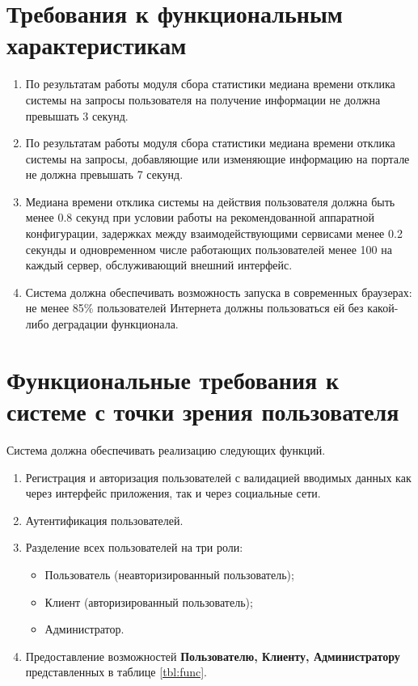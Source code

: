\section*{Требования к функциональным характеристикам}
\begin{enumerate}
	\item По результатам работы модуля сбора статистики медиана времени отклика системы на запросы пользователя на получение информации не должна превышать 3 секунд.
	
	\item По результатам работы модуля сбора статистики медиана времени отклика системы на запросы, добавляющие или изменяющие информацию на портале не должна превышать 7 секунд.
	
	\item Медиана времени отклика системы на действия пользователя должна быть менее 0.8 секунд при условии работы на рекомендованной аппаратной конфигурации, задержках между взаимодействующими сервисами менее 0.2 секунды и одновременном числе работающих пользователей менее 100 на каждый сервер, обслуживающий внешний интерфейс.
	
	\item Система должна обеспечивать возможность запуска в современных браузерах: не менее 85\% пользователей Интернета должны пользоваться ей без какой-либо деградации функционала.
\end{enumerate}

\section*{Функциональные требования к системе с точки зрения пользователя}
Система должна обеспечивать реализацию следующих функций.
\begin{enumerate}
	\item Регистрация и авторизация пользователей с валидацией вводимых данных как через интерфейс приложения, так и через	социальные сети.
	
	\item Аутентификация пользователей.
	
	\item Разделение всех пользователей на три роли:
	\begin{itemize}
		\item Пользователь (неавторизированный пользователь);
		
		\item Клиент (авторизированный пользователь);
		
		\item Администратор.
	\end{itemize}
	
	\item Предоставление возможностей \textbf{Пользователю, Клиенту, Администратору} представленных в таблице \ref{tbl:func}.
\end{enumerate}

